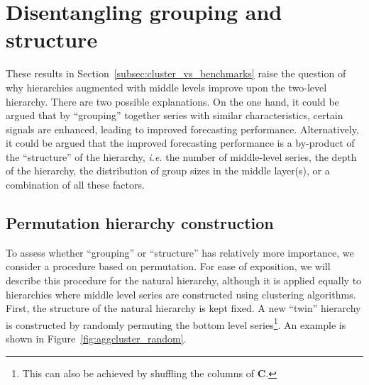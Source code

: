 \documentclass[a4paper,review,12pt,authoryear]{elsarticle}
\begin{document}

\section{Disentangling  grouping and structure}
\label{sec:permutation}

These results in Section~\ref{subsec:cluster_vs_benchmarks} raise the question of why hierarchies augmented with middle levels improve upon the two-level hierarchy. There are two possible explanations.  On the one hand, it could be argued that by ``grouping'' together series with similar characteristics, certain signals are enhanced, leading to improved forecasting performance.
Alternatively, it could be argued that the improved forecasting performance is a by-product of the ``structure'' of the hierarchy, \textit{i.e.} the number of middle-level series, the depth of the hierarchy, the distribution of group sizes in the middle layer(s), or a combination of all these factors.
\subsection{Permutation hierarchy construction}
\label{subsec:permutation}

 



To assess whether ``grouping'' or ``structure'' has relatively more importance, we consider a procedure based on permutation. For ease of exposition, we will describe this procedure for the natural hierarchy, although it is applied equally to hierarchies where middle level series are constructed using clustering algorithms. First, the structure of the natural hierarchy is kept fixed. A new ``twin'' hierarchy is constructed by randomly permuting the bottom level series\footnote{This can also be achieved by shuffling the columns of $\boldsymbol{C}$.}. An example is shown in Figure~\ref{fig:aggcluster_random}.
\end{document}
